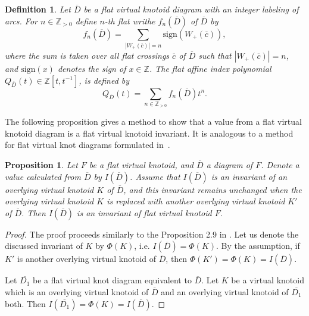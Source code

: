 \documentclass[11pt]{amsart}
\theoremstyle{noparens}
\newtheorem{proposition}{Proposition}[section]
\newtheorem{definition}{Definition}[section]
\numberwithin{equation}{section}
\numberwithin{equation}{section}
\begin{document}
\begin{definition} {\rm 
Let $\overline{D}$ be a flat virtual knotoid diagram with an integer labeling of arcs. For $n\in \mathbb{Z}_{> 0}$ define  \textit{$n$-th flat writhe} $f_n (\overline{D})$ of $\overline{D}$ by  
\begin{equation} 
f_n (\overline{D}) = \sum_{|W_{+} (\overline{c})| =n} \mathrm{sign} \left( W_+(\overline{c}) \right),
\end{equation}
where the sum is taken over all flat crossings $\overline{c}$ of $\overline{D}$ such that $|W_+(\overline{c})|=n$, and $\mathrm{sign} (x)$ denotes the sign of $x \in \mathbb Z$.  
The \textit{flat affine index polynomial} $Q_{\overline{D}} ( t )\in \mathbb{Z} [ t , t^{-1}]$, is defined by 
\begin{equation}
Q _ {\overline{D}} ( t ) = \sum_{ n \in \mathbb{Z} _ {>0}} f_{n} (\overline{D}) t^n.
\end{equation}
}
\end{definition}

The following proposition gives a method to show that a value from a flat virtual knotoid diagram is a flat virtual knotoid invariant. It is analogous to a method for flat virtual knot diagrams formulated in~\cite[Prop.2.9]{Kim}. 

\begin{proposition}\label{prop1}
Let $F$ be a flat virtual knotoid, and $\overline{D}$ a diagram of $F$. Denote a value calculated from $\overline{D}$ by $I(\overline{D})$. Assume that $I(\overline{D})$ is an invariant of an overlying virtual knotoid $K$ of $\overline{D}$, and this invariant remains unchanged when the overlying virtual knotoid $K$ is replaced with another overlying virtual knotoid $K'$ of $\overline{D}$. Then $I(\overline{D})$ is an invariant of flat virtual knotoid $F$. 
\end{proposition}

\begin{proof}
The proof proceeds similarly to the Proposition 2.9 in \cite{Kim}. Let us denote the discussed invariant of $K$ by $\Phi(K)$, i.e. $I(\overline{D}) = \Phi(K)$. By the assumption, if $K'$ is another overlying virtual knotoid of $\overline{D}$, then $\Phi(K') = \Phi(K) = I(\overline{D})$. 

Let $\overline{D_1}$ be a flat virtual knot diagram equivalent to $\overline{D}$. Let $K$ be a virtual knotoid which is an overlying virtual knotoid of $\overline{D}$ and an overlying virtual knotoid of $\overline{D_1}$ both. Then $I(\overline{D_1}) = \Phi(K) = I(\overline{D})$. 
\end{proof}
\end{document}
